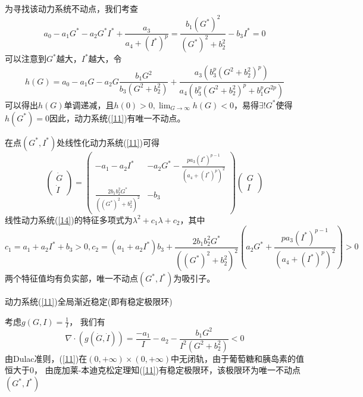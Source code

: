 \begin{pf}
    为寻找该动力系统不动点，我们考查
\begin{equation}
    a_0-a_1G^*-a_2G^*I^*+\frac{a_3}{a_4+(I^*)^p}= \frac{b_1 (G^*)^2}{(G^*)^2 + b_2^2} - b_3 I^*=0
\end{equation}
可以注意到$G^*$越大，$I^*$越大，令
\begin{equation}
    h(G)=a_0-a_1G-a_2G\frac{b_1G^2}{b_3(G^2+b_2^2)}+\frac{a_3(b_3^p(G^2+b_2^2)^p)}{a_4(b_3^p(G^2+b_2^2)^p+b_1^pG^{2p})}
\end{equation}
可以得出$h(G)$单调递减，且$h(0)>0,\lim_{G\to\infty}h(G)<0$，易得$\exists !G^*$使得$h(G^*)=0$因此，动力系统(\ref{11})有唯一不动点。

在点$(G^*,I^*)$处线性化动力系统(\ref{11})可得 
\begin{equation}\label{14}
    \begin{pmatrix}
        \dot{G}\\
        \dot{I}
    \end{pmatrix}=\begin{pmatrix}
        -a_1-a_2I^* & -a_2G^*-\frac{pa_3(I^*)^{p-1}}{(a_4+(I^*)^p)^2}\\
        \frac{2b_1b_2^2G^*}{((G^*)^2 + b_2^2)^2} & -b_3
    \end{pmatrix}\begin{pmatrix}
        G\\
        I
    \end{pmatrix}
\end{equation}
线性动力系统(\ref{14})的特征多项式为$\lambda^2+c_1\lambda+c_2$，其中
\begin{equation*}
    c_1=a_1+a_2I^*+b_3>0, c_2=(a_1+a_2I^*)b_3+\frac{2b_1b_2^2G^*}{((G^*)^2 + b_2^2)^2}(a_2G^*+\frac{pa_3(I^*)^{p-1}}{(a_4+(I^*)^p)^2})>0
\end{equation*}
两个特征值均有负实部，唯一不动点$(G^*,I^*)$为吸引子\cite{strogatz2018nonlinear}。

\end{pf}
\begin{prop}\label{prop2}
    动力系统(\ref{11})全局渐近稳定(即有稳定极限环)
\end{prop}
\begin{pf}
    考虑$g(G,I)=\frac{1}{I}$， 我们有
    \begin{equation}
        \nabla\cdot(g(\dot{G},\dot{I}))=\frac{-a_1}{I}-a_2-\frac{b_1 G^2}{I^2(G^2 + b_2^2)}<0
    \end{equation}
    由Dulac准则，(\ref{11})在$(0,+\infty)\times (0,+\infty)$中无闭轨，由于葡萄糖和胰岛素的值恒大于$0$， 由庞加莱-本迪克松定理知(\ref{11})有稳定极限环，该极限环为唯一不动点$(G^*,I^*)$
\end{pf}

